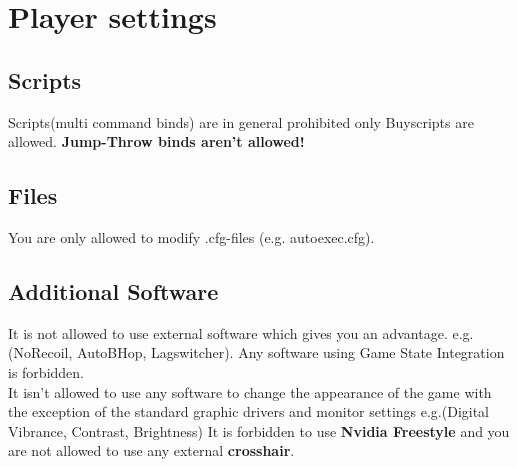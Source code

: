\documentclass{article}
\begin{document}
\section{Player settings}

\subsection{Scripts}
Scripts(multi command binds) are in general prohibited only Buyscripts are allowed.
\textbf{Jump-Throw binds aren't allowed!}

\subsection{Files}
You are only allowed to modify .cfg-files (e.g. autoexec.cfg).\\

\subsection{Additional Software}
It is not allowed to use external software which gives you an advantage. e.g.(NoRecoil, AutoBHop, Lagswitcher). Any software using Game State Integration is forbidden.\\
It isn't allowed to use any software to change the appearance of the game with the exception of the standard graphic drivers and monitor settings e.g.(Digital Vibrance, Contrast, Brightness)
It is forbidden to use \textbf{Nvidia Freestyle} and you are not allowed to use any external \textbf{crosshair}.

\pagebreak
\end{document}
